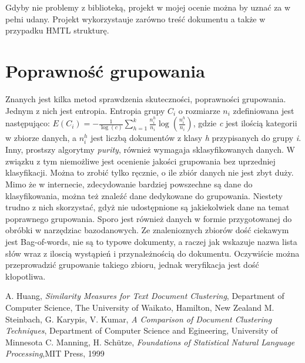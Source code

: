 \documentclass{article}
\begin{document}
Gdyby nie problemy z biblioteką, projekt w mojej ocenie można by uznać za w pełni udany. Projekt wykorzystauje zarówno treść dokumentu a także w przypadku HMTL strukturę. 

\section{Poprawność grupowania}
Znanych jest kilka metod sprawdzenia skuteczności, poprawności grupowania. Jednym z nich jest entropia. Entropia grupy \( C_{i} \) o rozmiarze \( n_{i} \) zdefiniowana jest następująco:
\( E(C_{i}) = -\frac{1}{\log(c)}\sum_{h=1}^{k}\frac{n_i^h}{n_i}\log(\frac{n_i^h}{n_i}) \), gdzie \emph{c} jest ilością kategorii w zbiorze danych, a \( n_i^h  \) jest liczbą dokumentów z klasy \emph{h} przypisanych do grupy \emph{i}. Inny, prostszy algorytmy \emph{purity}, również wymagaja sklasyfikowanych danych. W związku z tym niemożliwe jest ocenienie jakości grupowania bez uprzedniej klasyfikacji. Można to zrobić tylko ręcznie, o ile zbiór danych nie jest zbyt duży.
Mimo że w internecie, zdecydowanie bardziej powszechne są dane do klasyfikowania, można też znaleźć dane dedykowane do grupowania. Niestety trudno z nich skorzystać, gdyż nie udostępnione są jakiekolwiek dane na temat poprawnego grupowania. Sporo jest również danych w formie przygotowanej do obróbki w narzędziac bazodanowych. 
Ze znalenioznych zbiorów dość ciekawym jest Bag-of-words, nie są to typowe dokumenty, a raczej jak wskazuje nazwa lista słów wraz z iloscią wystąpień i przynależnością do dokumentu. Oczywiście można przeprowadzić grupowanie takiego zbioru, jednak weryfikacja jest dość kłopotliwa.

\begin{thebibliography}{9}
A. Huang, \emph{Similarity Measures for Text Document Clustering}, Department of Computer Science, The University of Waikato, Hamilton, New Zealand
M. Steinbach, G. Karypis, V. Kumar, \emph{A Comparison of Document Clustering Techniques}, Department of Computer Science and Egineering, University of Minnesota
C. Manning, H. Schütze, \emph{Foundations of Statistical Natural Language Processing},MIT Press, 1999
\end{thebibliography}
\end{document}
